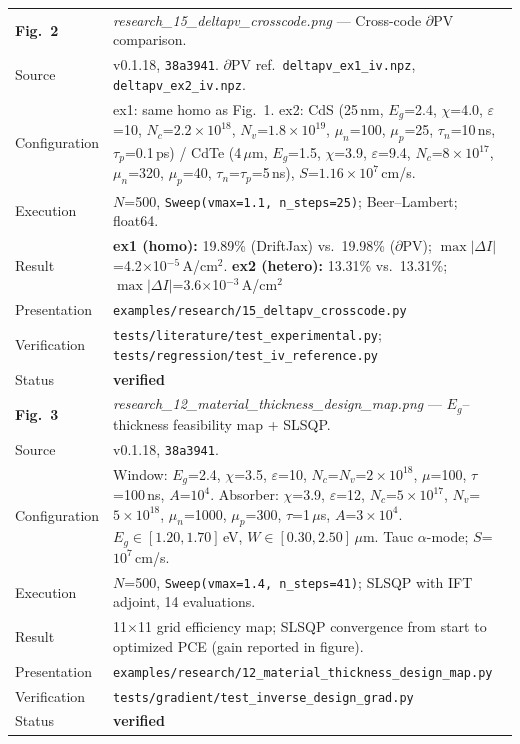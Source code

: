 \documentclass[11pt,a4paper]{article}
\begin{document}
\begin{table}[tbp]
\begin{tabularx}{\linewidth}{@{}Z Y@{}}
\textbf{Fig.~2} &
\textit{research\_15\_deltapv\_crosscode.png} --- Cross-code
$\partial$PV comparison. \\
Source & v0.1.18, \texttt{38a3941}. $\partial$PV ref.\ \texttt{deltapv\_ex1\_iv.npz}, \texttt{deltapv\_ex2\_iv.npz}. \\
Configuration &
  ex1: same homo as Fig.~1.
  ex2: CdS (25\,nm, $E_g$=2.4, $\chi$=4.0, $\varepsilon$=10,
  $N_c$=$2.2{\times}10^{18}$, $N_v$=$1.8{\times}10^{19}$, $\mu_n$=100,
  $\mu_p$=25, $\tau_n$=10\,ns, $\tau_p$=0.1\,ps)
  / CdTe (4\,$\mu$m, $E_g$=1.5, $\chi$=3.9, $\varepsilon$=9.4,
  $N_c$=$8{\times}10^{17}$, $\mu_n$=320, $\mu_p$=40, $\tau_n$=$\tau_p$=5\,ns),
  $S$=$1.16{\times}10^7$\,cm/s. \\
Execution &
  $N$=500, \texttt{Sweep(vmax=1.1, n\_steps=25)};
  Beer--Lambert; float64. \\
Result &
  \textbf{ex1 (homo):} 19.89\% (DriftJax) vs.\ 19.98\% ($\partial$PV);
  $\max|\Delta I|$=4.2$\times$10$^{-5}$\,A/cm$^2$.
  \textbf{ex2 (hetero):} 13.31\% vs.\ 13.31\%;
  $\max|\Delta I|$=3.6$\times$10$^{-3}$\,A/cm$^2$ \\
Presentation &
  \texttt{examples/research/15\_deltapv\_crosscode.py} \\
Verification &
  \texttt{tests/literature/test\_experimental.py};
  \texttt{tests/regression/test\_iv\_reference.py} \\
Status & \textcolor{green!50!black}{\textbf{verified}} \\[4pt]

\textbf{Fig.~3} &
\textit{research\_12\_material\_thickness\_design\_map.png} ---
$E_g$--thickness feasibility map + SLSQP. \\
Source & v0.1.18, \texttt{38a3941}. \\
Configuration &
  Window: $E_g$=2.4, $\chi$=3.5, $\varepsilon$=10, $N_c$=$N_v$=$2{\times}10^{18}$,
  $\mu$=100, $\tau$=100\,ns, $A$=$10^4$.  Absorber: $\chi$=3.9,
  $\varepsilon$=12, $N_c$=$5{\times}10^{17}$, $N_v$=$5{\times}10^{18}$,
  $\mu_n$=1000, $\mu_p$=300, $\tau$=1\,$\mu$s, $A$=$3{\times}10^4$.
  $E_g\in[1.20,1.70]$\,eV, $W\in[0.30,2.50]$\,$\mu$m.
  Tauc $\alpha$-mode; $S$=$10^7$\,cm/s. \\
Execution &
  $N$=500, \texttt{Sweep(vmax=1.4, n\_steps=41)}; SLSQP with IFT adjoint,
  14 evaluations. \\
Result &
  11$\times$11 grid efficiency map; SLSQP convergence from start to
  optimized PCE (gain reported in figure). \\
Presentation &
  \texttt{examples/research/12\_material\_thickness\_design\_map.py} \\
Verification &
  \texttt{tests/gradient/test\_inverse\_design\_grad.py} \\
Status & \textcolor{green!50!black}{\textbf{verified}} \\[4pt]


\end{tabularx}
\end{table}
\end{document}
